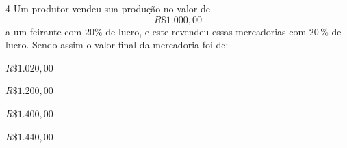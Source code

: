 

\num{4}  Um produtor vendeu sua produção no valor de $$R\$1.000,00$$ a um
feirante com $20\%$ de lucro, e este revendeu essas mercadorias com $20\,\%$
de lucro. Sendo assim o valor final da mercadoria foi de:

\begin{escolha}
\item $R\$1.020,00$
\item $R\$1.200,00$
\item $R\$1.400,00$
\item $R\$1.440,00$
\end{escolha}



